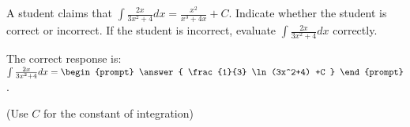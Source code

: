 \documentclass{ximera}
\author{Jim Talamo}
\begin{document}
\begin{exercise}
A student claims that $\int \frac{2x}{3x^2+4} dx = \frac{x^2}{x^3+4x}+C$.  Indicate whether the student is correct or incorrect.  If the student is incorrect, evaluate $\int \frac{2x}{3x^2+4} dx$ correctly.

\begin{multipleChoice}  

The correct response is: $\int \frac{2x}{3x^2+4} dx = \begin{prompt} \answer{ \frac{1}{3} \ln(3x^2+4) +C } \end{prompt} $.
\end{multipleChoice}

\begin{prompt} (Use $C$ for the constant of integration) \end{prompt}

\end{exercise}
\end{document}
